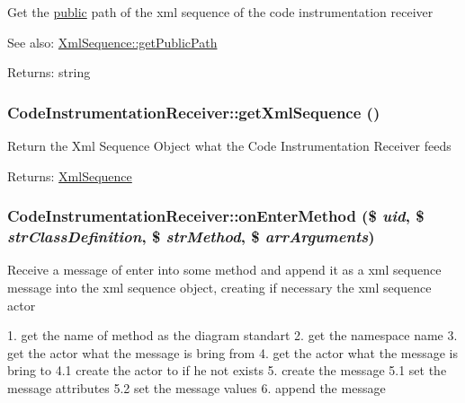 Get the \hyperlink{namespacepublic}{public} path of the xml sequence of the code instrumentation receiver

\begin{Desc}
\item[See also:]\hyperlink{class_xml_sequence_156bcaa4792dca6a381621d68052ba32}{XmlSequence::getPublicPath} \end{Desc}
\begin{Desc}
\item[Returns:]string \end{Desc}
\hypertarget{class_code_instrumentation_receiver_addf964fe411ef0c9d4caa4745d22a31}{
\subsubsection[{getXmlSequence}]{\setlength{\rightskip}{0pt plus 5cm}CodeInstrumentationReceiver::getXmlSequence ()}}
\label{class_code_instrumentation_receiver_addf964fe411ef0c9d4caa4745d22a31}


Return the Xml Sequence Object what the Code Instrumentation Receiver feeds

\begin{Desc}
\item[Returns:]\hyperlink{class_xml_sequence}{XmlSequence} \end{Desc}
\hypertarget{class_code_instrumentation_receiver_51bfc5d088d4cf97f850a64cc9b76944}{
\subsubsection[{onEnterMethod}]{\setlength{\rightskip}{0pt plus 5cm}CodeInstrumentationReceiver::onEnterMethod (\$ {\em uid}, \/  \$ {\em strClassDefinition}, \/  \$ {\em strMethod}, \/  \$ {\em arrArguments})}}
\label{class_code_instrumentation_receiver_51bfc5d088d4cf97f850a64cc9b76944}


Receive a message of enter into some method and append it as a xml sequence message into the xml sequence object, creating if necessary the xml sequence actor

1. get the name of method as the diagram standart 2. get the namespace name 3. get the actor what the message is bring from 4. get the actor what the message is bring to 4.1 create the actor to if he not exists 5. create the message 5.1 set the message attributes 5.2 set the message values 6. append the message

